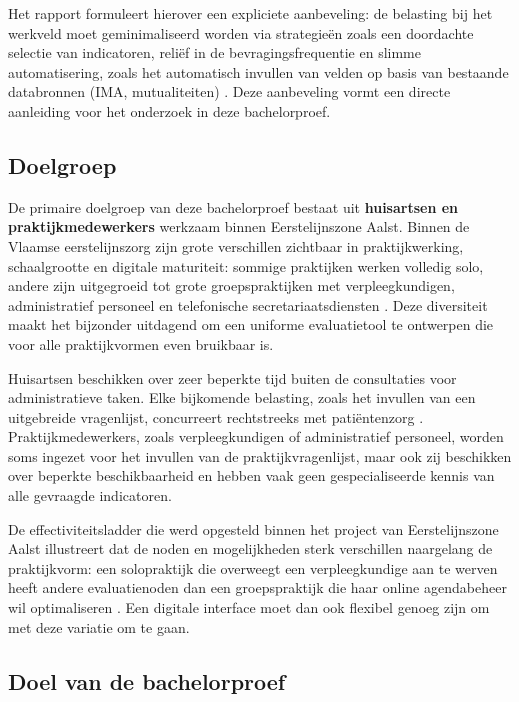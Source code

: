 Het rapport formuleert hierover een expliciete aanbeveling: de belasting bij het werkveld moet
geminimaliseerd worden via strategieën zoals een doordachte selectie van indicatoren, reliëf
in de bevragingsfrequentie en slimme automatisering, zoals het automatisch invullen van
velden op basis van bestaande databronnen (IMA, mutualiteiten) \autocite{Merckx2023}. Deze
aanbeveling vormt een directe aanleiding voor het onderzoek in deze bachelorproef.

\subsection{Doelgroep}
\label{subsec:doelgroep}

De primaire doelgroep van deze bachelorproef bestaat uit \textbf{huisartsen en
praktijkmedewerkers} werkzaam binnen Eerstelijnszone Aalst. Binnen de Vlaamse
eerstelijnszorg zijn grote verschillen zichtbaar in praktijkwerking, schaalgrootte en digitale
maturiteit: sommige praktijken werken volledig solo, andere zijn uitgegroeid tot grote
groepspraktijken met verpleegkundigen, administratief personeel en telefonische
secretariaatsdiensten \autocite{Rampelberg2025a}. Deze diversiteit maakt het bijzonder
uitdagend om een uniforme evaluatietool te ontwerpen die voor alle praktijkvormen even
bruikbaar is.
\medskip

Huisartsen beschikken over zeer beperkte tijd buiten de consultaties voor administratieve
taken. Elke bijkomende belasting, zoals het invullen van een uitgebreide vragenlijst, concurreert
rechtstreeks met patiëntenzorg \autocite{Merckx2023}. Praktijkmedewerkers, zoals
verpleegkundigen of administratief personeel, worden soms ingezet voor het invullen van de
praktijkvragenlijst, maar ook zij beschikken over beperkte beschikbaarheid en hebben vaak
geen gespecialiseerde kennis van alle gevraagde indicatoren.
\medskip

De effectiviteitsladder die werd opgesteld binnen het project van Eerstelijnszone Aalst
illustreert dat de noden en mogelijkheden sterk verschillen naargelang de praktijkvorm: een
solopraktijk die overweegt een verpleegkundige aan te werven heeft andere evaluatienoden
dan een groepspraktijk die haar online agendabeheer wil optimaliseren \autocite{Rampelberg2025a}.
Een digitale interface moet dan ook flexibel genoeg zijn om met deze variatie om te gaan.

\subsection{Doel van de bachelorproef}
\label{subsec:doel-bp}

